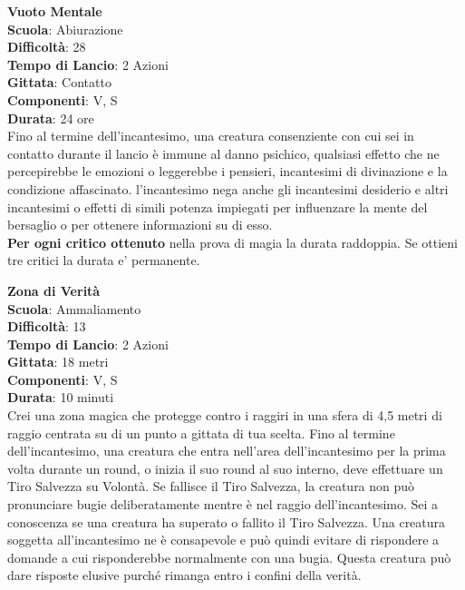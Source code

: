 \begin{multicols}{2}
\medskip\textbf{Vuoto Mentale}\\
\textbf{Scuola}: Abiurazione\\
\textbf{Difficoltà}:  28\\
\textbf{Tempo di Lancio}: 2 Azioni\\
\textbf{Gittata}: Contatto\\
\textbf{Componenti}: V, S\\
\textbf{Durata}: 24 ore\\
Fino al termine dell'incantesimo, una creatura consenziente con cui sei in contatto durante il lancio è immune al danno psichico, qualsiasi effetto che ne percepirebbe le emozioni o leggerebbe i pensieri, incantesimi di divinazione e la condizione affascinato.  l'incantesimo nega anche gli incantesimi desiderio e altri incantesimi o effetti di simili potenza impiegati per
influenzare la mente del bersaglio o per ottenere informazioni su di esso.\\
\textbf{Per ogni critico ottenuto} nella prova di magia  la durata raddoppia. Se ottieni tre critici la durata e' permanente.

\medskip\textbf{Zona di Verità}\\
\textbf{Scuola}: Ammaliamento\\
\textbf{Difficoltà}:  13\\
\textbf{Tempo di Lancio}: 2 Azioni\\
\textbf{Gittata}: 18 metri\\
\textbf{Componenti}: V, S\\
\textbf{Durata}: 10 minuti\\
Crei una zona magica che protegge contro i raggiri in una sfera di 4,5 metri di raggio centrata su di un punto a gittata di tua scelta. Fino al termine dell'incantesimo, una creatura che entra nell'area dell'incantesimo per la prima volta durante un round, o inizia il suo round al suo interno, deve effettuare un Tiro Salvezza su Volontà. Se fallisce il Tiro Salvezza, la creatura non può pronunciare bugie deliberatamente mentre è nel raggio dell'incantesimo. Sei a conoscenza se una creatura ha superato o fallito il Tiro Salvezza. Una creatura soggetta all'incantesimo ne è consapevole e può quindi evitare di rispondere a domande a cui risponderebbe normalmente con una bugia. Questa creatura può dare risposte elusive purché rimanga entro i confini della verità.

\end{multicols}

